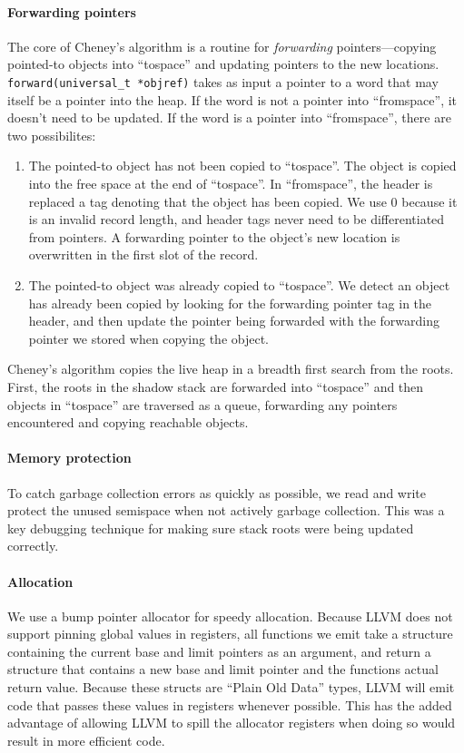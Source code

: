 \documentclass{article}
\begin{document}
\paragraph{Forwarding pointers} The core of Cheney's algorithm is a routine for \emph{forwarding} pointers---copying pointed-to objects into ``tospace'' and updating pointers to the new locations. \lstinline!forward(universal_t *objref)! takes as input a pointer to a word that may itself be a pointer into the heap. If the word is not a pointer into ``fromspace'', it doesn't need to be updated. If the word is a pointer into ``fromspace'', there are two possibilites:
\begin{enumerate}
\item The pointed-to object has not been copied to ``tospace''. The object is copied into the free space at the end of ``tospace''. In ``fromspace'', the header is replaced a tag denoting that the object has been copied. We use 0 because it is an invalid record length, and header tags never need to be differentiated from pointers. A forwarding pointer to the object's new location is overwritten in the first slot of the record.
\item The pointed-to object was already copied to ``tospace''. We detect an object has already been copied by looking for the forwarding pointer tag in the header, and then update the pointer being forwarded with the forwarding pointer we stored when copying the object.
\end{enumerate}
Cheney's algorithm copies the live heap in a breadth first search from the roots. First, the roots in the shadow stack are forwarded into ``tospace'' and then objects in ``tospace'' are traversed as a queue, forwarding any pointers encountered and copying reachable objects.

\paragraph{Memory protection} To catch garbage collection errors as quickly as possible, we read and write protect the unused semispace when not actively garbage collection. This was a key debugging technique for making sure stack roots were being updated correctly.

\paragraph{Allocation} We use a bump pointer allocator for speedy allocation. Because LLVM does not support pinning global values in registers, all functions we emit take a structure containing the current base and limit pointers as an argument, and return a structure that contains a new base and limit pointer and the functions actual return value. Because these structs are ``Plain Old Data'' types, LLVM will emit code that passes these values in registers whenever possible. This has the added advantage of allowing LLVM to spill the allocator registers when doing so would result in more efficient code.
\end{document}
